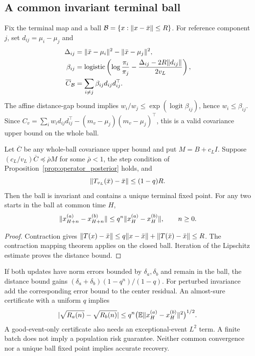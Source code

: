 \subsection{A common invariant terminal ball}
Fix the terminal map and a ball
$\mathcal B=\{x:\lVert x-\bar x\rVert\le R\}$.
For reference component $j$, set $d_{ij}=\mu_i-\mu_j$ and
\begin{align}
 \Delta_{ij}&=\lVert\bar x-\mu_i\rVert^2-\lVert\bar x-\mu_j\rVert^2,\\
 \beta_{ij}&=\operatorname{logistic}\left(
 \log\frac{\pi_i}{\pi_j}-\frac{\Delta_{ij}-2R\lVert d_{ij}\rVert}{2v_L}\right),\\
 \overline C_{\mathcal B}&=\sum_{i\ne j}\beta_{ij}d_{ij}d_{ij}^\top.
\end{align}
The affine distance-gap bound implies $w_i/w_j\le
\exp(\operatorname{logit}\beta_{ij})$, hence $w_i\le\beta_{ij}$.
Since
$C_v=\sum_iw_id_{ij}d_{ij}^\top-(m_v-\mu_j)(m_v-\mu_j)^\top$,
this is a valid covariance upper bound on the whole ball.

\begin{proposition}\label{prop:common_terminal_ball}
Let $\overline C$ be any whole-ball covariance upper bound and put
$M=B+c_LI$. Suppose $(c_L/v_L)\overline C\preceq\bar\rho M$
for some $\bar\rho<1$, the step condition of
Proposition~\ref{prop:operator_posterior} holds, and
\[
 \lVert T_{v_L}(\bar x)-\bar x\rVert\le(1-q)R.
\]
Then the ball is invariant and contains a unique terminal fixed point.
For any two starts in the ball at common time $H$,
\[
 \lVert x^{(a)}_{H+n}-x^{(b)}_{H+n}\rVert
 \le q^n\lVert x^{(a)}_H-x^{(b)}_H\rVert,\qquad n\ge0.
\]
\end{proposition}
\begin{proof}
Contraction gives
$\lVert T(x)-\bar x\rVert\le q\lVert x-\bar x\rVert+\lVert T(\bar x)-\bar x\rVert\le R$.
The contraction mapping theorem applies on the closed ball.
Iteration of the Lipschitz estimate proves the distance bound.
\end{proof}
If both updates have norm errors bounded by $\delta_a,\delta_b$
and remain in the ball, the distance bound gains
$(\delta_a+\delta_b)(1-q^n)/(1-q)$.
For perturbed invariance add the corresponding error bound to the
center residual.
An almost-sure certificate with a uniform $q$ implies
\[
 |\sqrt{R_a(n)}-\sqrt{R_b(n)}|
 \le q^n\big(\mathbb E\lVert x_H^{(a)}-x_H^{(b)}\rVert^2\big)^{1/2}.
\]
A good-event-only certificate also needs an exceptional-event
$L^2$ term. A finite batch does not imply a population risk guarantee.
Neither common convergence nor a unique ball fixed point implies
accurate recovery.

